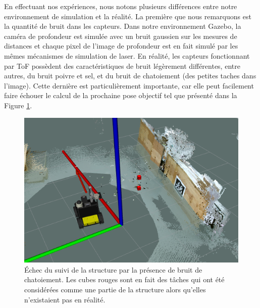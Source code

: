 En effectuant nos expériences, nous notons plusieurs différences entre notre environnement de simulation et la réalité. La première que nous remarquons est la quantité de bruit dans les capteurs. Dans notre environnement Gazebo, la caméra de profondeur est simulée avec un bruit gaussien sur les mesures de distances et chaque pixel de l'image de profondeur est en fait simulé par les mêmes mécanismes de simulation de laser. En réalité, les capteurs fonctionnant par ToF possèdent des caractéristiques de bruit légèrement différentes, entre autres, du bruit poivre et sel, et du bruit de chatoiement (des petites taches dans l'image). Cette dernière est particulièrement importante, car elle peut facilement faire échouer le calcul de la prochaine pose objectif tel que présenté dans la Figure \ref{fig:speckle_fail}.

\begin{figure}[!th]
  \centering
  \includegraphics[width=0.7\linewidth]{images/speckle.png}
  \caption[Échec du suivi de la structure par la présence de bruit de chatoiement]{Échec du suivi de la structure par la présence de bruit de chatoiement. Les cubes rouges sont en fait des tâches qui ont été considérées comme une partie de la structure alors qu'elles n'existaient pas en réalité.}
  \label{fig:speckle_fail}
\end{figure}


